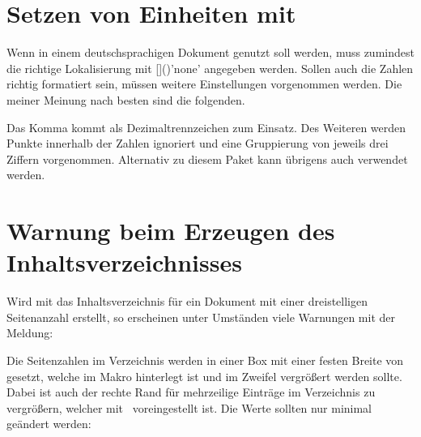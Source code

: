 \section{Setzen von Einheiten mit }
%
%
%
Wenn  in einem deutschsprachigen Dokument genutzt soll
werden, muss zumindest die richtige Lokalisierung mit
[]()'none' angegeben 
werden. Sollen auch die Zahlen richtig formatiert sein, müssen weitere 
Einstellungen vorgenommen werden. Die meiner Meinung nach besten sind die 
folgenden.
%
\begin{quoting}
\begin{Code}
\end{Code}
\end{quoting}
%
Das Komma kommt als Dezimaltrennzeichen zum Einsatz. Des Weiteren werden Punkte 
innerhalb der Zahlen ignoriert und eine Gruppierung von jeweils drei Ziffern 
vorgenommen. Alternativ zu diesem Paket kann übrigens auch  
verwendet werden.



\section{Warnung beim Erzeugen des Inhaltsverzeichnisses}
%
%
Wird mit  das Inhaltsverzeichnis für ein Dokument mit 
einer dreistelligen Seitenanzahl erstellt, so erscheinen unter Umständen viele 
Warnungen mit der Meldung:
%
\begin{quoting}
\end{quoting}
%
Die Seitenzahlen im Verzeichnis werden in einer Box mit einer festen Breite 
von~\PValue{1.55em} gesetzt, welche im Makro  hinterlegt ist 
und im Zweifel vergrößert werden sollte. Dabei ist auch der rechte Rand für 
mehrzeilige Einträge im Verzeichnis  zu vergrößern, welcher 
mit~\PValue{2.55em} voreingestellt ist. Die Werte sollten nur minimal geändert 
werden:
%
\begin{quoting}
\begin{Code}
\makeatletter
\renewcommand*{\@pnumwidth}{1.7em}\renewcommand*{\@tocrmarg}{2.7em}
\makeatother
\end{Code}
\end{quoting}



